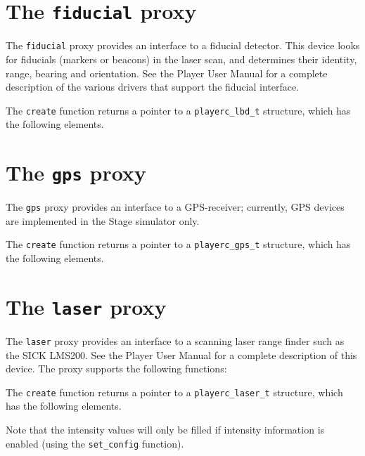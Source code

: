 \documentclass[11pt]{report}
\begin{document}
\newpage
\section{The {\tt fiducial} proxy}

The {\tt fiducial} proxy provides an interface to a fiducial detector.
This device looks for fiducials (markers or beacons) in the laser
scan, and determines their identity, range, bearing and orientation.
See the Player User Manual for a complete description of the various
drivers that support the fiducial interface.
\begin{quote}

\end{quote}
The {\tt create} function returns a pointer to a {\tt playerc\_lbd\_t}
structure, which has the following elements.
\begin{quote}

\end{quote}


\newpage
\section{The {\tt gps} proxy}

\noindent The {\tt gps} proxy provides an interface to a GPS-receiver;
currently, GPS devices are implemented in the Stage simulator only.
\begin{quote}

\end{quote}
The {\tt create} function returns a pointer to a {\tt playerc\_gps\_t}
structure, which has the following elements.
\begin{quote}

\end{quote}


\newpage
\section{The {\tt laser} proxy}

The {\tt laser} proxy provides an interface to a scanning laser range
finder such as the SICK LMS200.  See the Player User Manual for a
complete description of this device.  The proxy supports the
following functions:
\begin{quote}

\end{quote}
The {\tt create} function returns a pointer to a {\tt playerc\_laser\_t}
structure, which has the following elements.
\begin{quote}

\end{quote}
Note that the intensity values will only be filled if intensity information
is enabled (using the {\tt set\_config} function).
\end{document}
